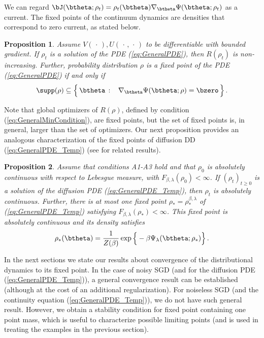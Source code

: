 \documentclass[11pt]{article}
\newtheorem{proposition}{Proposition}
\renewcommand{\eqref}[1]{(\ref{#1})}
\begin{document}
We can regard $\bJ(\btheta;\rho_t) = \rho_t(\btheta) \nabla_{\btheta}\Psi(\btheta;\rho_t)$ as a current.
The fixed points of the continuum dynamics are densities that correspond to zero current, as stated below.
%
\begin{proposition}\label{thm:FixedPoints}
Assume $V(\,\cdot\,), U(\,\cdot\,,\,\cdot\,)$ to be differentiable with  bounded gradient.
If $\rho_t$ is a solution of the PDE \eqref{eq:GeneralPDE}, then $R(\rho_t)$ is non-increasing.
%
Further, probability distribution $\rho$ is a fixed point of the PDE \eqref{eq:GeneralPDE} if and only if
%
\begin{align}
%
\supp(\rho) \subseteq \Big\{\,\btheta\, :\;\;\;
\nabla_{\btheta}\Psi(\btheta;\rho) = \bzero\, \Big\}\, . \label{eq:FP_Condition}
%
\end{align}
%
%
\end{proposition}
%
Note that global optimizers of $R(\rho)$, defined by condition \eqref{eq:GeneralMinCondition}, are fixed points, but the set of fixed points is, in general, larger
than the set of optimizers.
Our next proposition provides an analogous characterization of the fixed points of diffusion DD \eqref{eq:GeneralPDE_Temp} (see \cite{carrillo2003kinetic} for  related results).
%
\begin{proposition}\label{thm:FixedPoints_Temp_finite}
Assume that conditions {\sf A1}-{\sf A3} hold and that $\rho_0$ is absolutely continuous with respect to Lebesgue measure, with $F_{\beta,\lambda}(\rho_0)<\infty$. 
If $(\rho_t)_{t\ge 0}$ is a solution of the diffusion PDE \eqref{eq:GeneralPDE_Temp}, then $\rho_t$ is absolutely continuous.
Further, there is at most one  fixed point $\rho_*=\rho_*^{\beta,\lambda}$ of \eqref{eq:GeneralPDE_Temp} satisfying $F_{\beta,\lambda}(\rho_*)<\infty$. This fixed point is absolutely continuous and its density satisfies
%
\begin{align}
%
\rho_*(\btheta) = \frac{1}{Z(\beta)} \exp\Big\{-\beta \Psi_{\lambda}(\btheta;\rho_*)\Big\}\, . \label{eq:FP_Condition_Temp}
%
\end{align}
%
\end{proposition}
%
In the next sections we state our results about convergence of the distributional dynamics
to its fixed point. In the case of noisy SGD (and for the diffusion PDE \eqref{eq:GeneralPDE_Temp}), a general convergence result can be established
(although at the cost of an additional regularization). For noiseless SGD (and the continuity equation \eqref{eq:GeneralPDE_Temp}), 
we do not have such general result. However, we obtain a stability condition for fixed point containing one point mass, which is
useful to characterize possible limiting points (and is used in treating the examples in the previous section).
\end{document}
